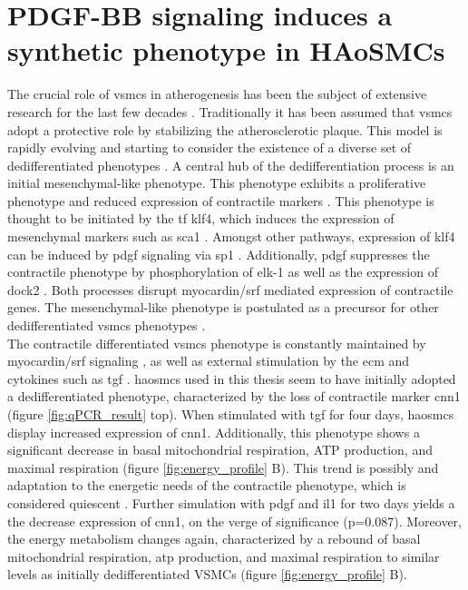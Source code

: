 \section{PDGF-BB signaling induces a synthetic phenotype in HAoSMCs}
The crucial role of \acp{vsmc} in atherogenesis has been the subject of extensive research for the last few decades \cite{grootaertVascularSmoothMuscle2021, yapSixShadesVascular2021}. Traditionally it has been assumed that \acp{vsmc} adopt a protective role by stabilizing the atherosclerotic plaque. This model is rapidly evolving and starting to consider the existence of a diverse set of dedifferentiated phenotypes \cite{liuSmoothMuscleCell2019}. A central hub of the dedifferentiation process is an initial mesenchymal-like phenotype. This phenotype exhibits a proliferative phenotype and reduced expression of contractile markers \cite{yapSixShadesVascular2021}. This phenotype is thought to be initiated by the \ac{tf} \ac{klf4}, which induces the expression of mesenchymal markers such as \ac{sca1} \cite{yapSixShadesVascular2021}. Amongst other pathways, expression of \ac{klf4} can be induced by \ac{pdgf} signaling \cite{liuKruppellikeFactorAbrogates2005} via \ac{sp1} \cite{deatonSp1dependentActivationKLF42009}. Additionally, \ac{pdgf} suppresses the contractile phenotype by phosphorylation of \ac{elk-1} \cite{wangMyocardinTernaryComplex2004} as well as the expression of \ac{dock2} \cite{guoDedicatorCytokinesisNovel2015}. Both processes disrupt myocardin/\ac{srf} mediated expression of contractile genes. The mesenchymal-like phenotype is postulated as a precursor for other dedifferentiated \acp{vsmc} phenotypes \cite{yapSixShadesVascular2021}.\\
The contractile differentiated \acp{vsmc} phenotype is constantly maintained by myocardin/\ac{srf} signaling \cite{longMyocardinSufficientSmooth2008}, as well as external stimulation by the \ac{ecm} and cytokines such as \ac{tgf} \cite{davis-dusenberyDownregulationKruppellikeFactor42011}. \acp{haosmc} used in this thesis seem to have initially adopted a dedifferentiated phenotype, characterized by the loss of contractile marker \ac{cnn1} \cite{owensMolecularRegulationVascular2004} (figure \ref{fig:qPCR_result} top). When stimulated with \ac{tgf} for four days, \acp{haosmc} display increased expression of \ac{cnn1}. Additionally, this phenotype shows a significant decrease in  basal mitochondrial respiration, ATP production, and maximal respiration (figure \ref{fig:energy_profile} B). This trend is possibly and adaptation to the energetic needs of the contractile phenotype, which is considered quiescent \cite{dobnikarDiseaserelevantTranscriptionalSignatures2018}. Further simulation with \ac{pdgf} and \ac{il1} for two days yields a the decrease expression of \ac{cnn1}, on the verge of significance (p=0.087). Moreover, the energy metabolism changes again, characterized by a rebound of basal mitochondrial respiration, \ac{atp} production, and maximal respiration to similar levels as initially dedifferentiated VSMCs (figure \ref{fig:energy_profile} B).\\
